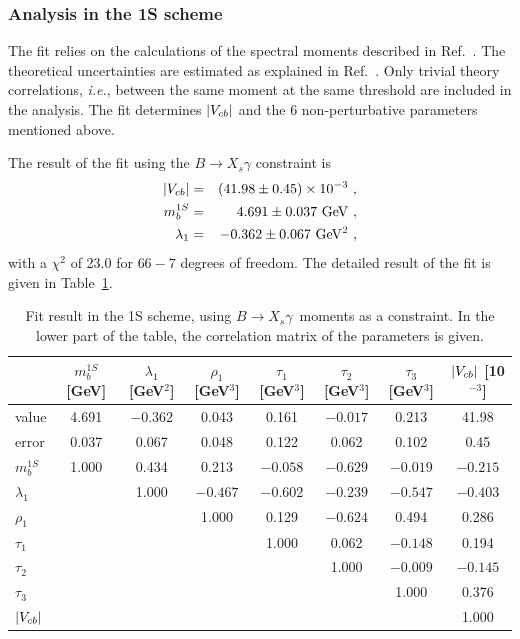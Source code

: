 \subsubsection{Analysis in the 1S scheme}
\label{globalfits1S}

The fit relies on the calculations of the spectral moments described in
Ref.~\cite{Bauer:2004ve}. The theoretical uncertainties are estimated
as explained in Ref.~\cite{Schwanda:2008kw}. Only trivial theory
correlations, {\it i.e.}, between the same moment at the same
threshold are included in the analysis. The fit determines $|V_{cb}|$ and
the 6 non-perturbative parameters mentioned above.

The result of the fit using the $B\to X_s\gamma$ constraint is
\begin{eqnarray}
  |V_{cb}| & = & (41.98\pm 0.45)\times 10^{-3}~, \\
  m_b^{1S} & = & 4.691\pm 0.037~{\rm GeV}~, \\
  \lambda_1 & = & -0.362\pm 0.067~{\rm GeV^2}~,
\end{eqnarray}
with a $\chi^2$ of 23.0 for $66-7$ degrees of freedom. The detailed
result of the fit is given in Table~\ref{tab:gf_res_xsgamma_1s}.
\begin{table}[!htb]
\caption{Fit result in the 1S scheme, using $B\to X_s\gamma$~moments
  as a constraint. In the lower part of the table, the correlation
  matrix of the parameters is given.} \label{tab:gf_res_xsgamma_1s}
\begin{center}
\begin{tabular}{|l|ccccccc|}
  \hline
  & $m_b^{1S}$ [GeV] & $\lambda_1$ [GeV$^2$] & $\rho_1$ [GeV$^3$] &
  $\tau_1$ [GeV$^3$] & $\tau_2$ [GeV$^3$] & $\tau_3$ [GeV$^3$] &
  $|V_{cb}|$ [10$^{-3}$]\\
  \hline \hline
  value & 4.691 & $-0.362$ & \phantom{$-$}0.043 &
  \phantom{$-$}0.161 & $-0.017$ & \phantom{$-$}0.213 &
  \phantom{$-$}41.98\\
  error & 0.037 & \phantom{$-$}0.067 & \phantom{$-$}0.048 &
  \phantom{$-$}0.122 & \phantom{$-$}0.062 & \phantom{$-$}0.102 &
  \phantom{$-$}0.45\\
  \hline
  $m_b^{1S}$ & 1.000 & \phantom{$-$}0.434 & \phantom{$-$}0.213 &
  $-0.058$ & $-0.629$ & $-0.019$ & $-0.215$\\
  $\lambda_1$ & & \phantom{$-$}1.000 & $-0.467$ & $-0.602$ & $-0.239$
  & $-0.547$ & $-0.403$\\
  $\rho_1$ & & & \phantom{$-$}1.000 & \phantom{$-$}0.129 & $-0.624$ &
  \phantom{$-$}0.494 & \phantom{$-$}0.286\\
  $\tau_1$ & & & & \phantom{$-$}1.000 & \phantom{$-$}0.062 & $-0.148$ &
  \phantom{$-$}0.194\\
  $\tau_2$ & & & & & \phantom{$-$}1.000 & $-0.009$ & $-0.145$\\
  $\tau_3$ & & & & & & \phantom{$-$}1.000 & \phantom{$-$}0.376\\
  $|V_{cb}|$ & & & & & & & \phantom{$-$}1.000\\
  \hline
\end{tabular}
\end{center}
\end{table}
